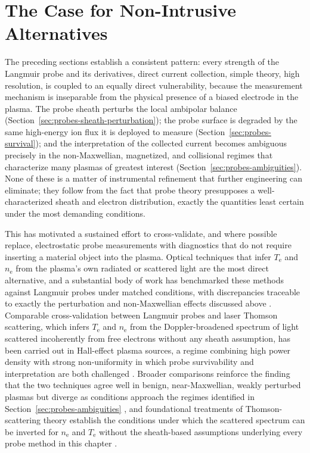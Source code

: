 \section{The Case for Non-Intrusive Alternatives}
\label{sec:probes-alternatives}

The preceding sections establish a consistent pattern: every strength of the Langmuir probe and its derivatives, direct current collection, simple theory, high resolution, is coupled to an equally direct vulnerability, because the measurement mechanism is inseparable from the physical presence of a biased electrode in the plasma. The probe sheath perturbs the local ambipolar balance (Section~\ref{sec:probes-sheath-perturbation}); the probe surface is degraded by the same high-energy ion flux it is deployed to measure (Section~\ref{sec:probes-survival}); and the interpretation of the collected current becomes ambiguous precisely in the non-Maxwellian, magnetized, and collisional regimes that characterize many plasmas of greatest interest (Section~\ref{sec:probes-ambiguities}). None of these is a matter of instrumental refinement that further engineering can eliminate; they follow from the fact that probe theory presupposes a well-characterized sheath and electron distribution, exactly the quantities least certain under the most demanding conditions.

This has motivated a sustained effort to cross-validate, and where possible replace, electrostatic probe measurements with diagnostics that do not require inserting a material object into the plasma. Optical techniques that infer $T_{\mathrm{e}}$ and $n_{\mathrm{e}}$ from the plasma's own radiated or scattered light are the most direct alternative, and a substantial body of work has benchmarked these methods against Langmuir probes under matched conditions, with discrepancies traceable to exactly the perturbation and non-Maxwellian effects discussed above \cite{ref0237}. Comparable cross-validation between Langmuir probes and laser Thomson scattering, which infers $T_{\mathrm{e}}$ and $n_{\mathrm{e}}$ from the Doppler-broadened spectrum of light scattered incoherently from free electrons without any sheath assumption, has been carried out in Hall-effect plasma sources, a regime combining high power density with strong non-uniformity in which probe survivability and interpretation are both challenged \cite{ref0355}. Broader comparisons reinforce the finding that the two techniques agree well in benign, near-Maxwellian, weakly perturbed plasmas but diverge as conditions approach the regimes identified in Section~\ref{sec:probes-ambiguities} \cite{ref0354}, and foundational treatments of Thomson-scattering theory establish the conditions under which the scattered spectrum can be inverted for $n_{\mathrm{e}}$ and $T_{\mathrm{e}}$ without the sheath-based assumptions underlying every probe method in this chapter \cite{ref0384}.

